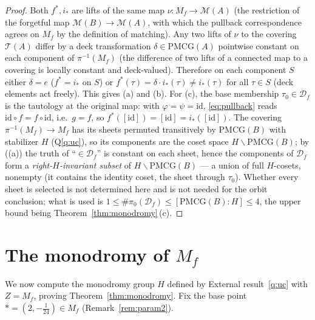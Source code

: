 \documentclass[11pt]{article}
\theoremstyle{definition}
\theoremstyle{remark}
\newcommand{\Teich}{\mathcal T}
\newcommand{\MM}{\mathcal M}
\newcommand{\PMCG}{\mathrm{PMCG}}
\newcommand{\Df}{\mathcal D_f}
\begin{document}
\begin{proof}
Both $f^*,i_*$ are lifts of the same map $\nu:M_f\to\MM(A)$ (the
restriction of the forgetful map $\MM(B)\to\MM(A)$, with which the
pullback correspondence agrees on $M_f$ by the definition of matching).
Any two lifts of $\nu$ to the covering $\Teich(A)$ differ by a deck
transformation $\delta\in\PMCG(A)$ pointwise constant on each component
of $\pi^{-1}(M_f)$ (the difference of two lifts of a connected map to
a covering is locally constant and deck-valued).  Therefore on each
component $S$ either $\delta=e$ ($f^*=i_*$ on $S$) or
$f^*(\tau)=\delta\cdot i_*(\tau)\neq i_*(\tau)$ for all $\tau\in S$
(deck elements act freely).  This gives (a) and (b).  For (c), the
base membership $\tau_0\in\Df$ is the tautology at the original map:
with $\varphi=\psi=\mathrm{id}$, \eqref{eq:pullback} reads
$\mathrm{id}\circ f=f\circ\mathrm{id}$, i.e.\ $g=f$, so
$f^*([\mathrm{id}])=[\mathrm{id}]=i_*([\mathrm{id}])$.  The covering
$\pi^{-1}(M_f)\to M_f$ has its sheets permuted transitively by
$\PMCG(B)$ with stabilizer $H$ \textup{(}Q\ref{q:uc}\textup{)}, so its
components are the coset space $H\backslash\PMCG(B)$; by
\textup{(}(a)\textup{)} the truth of ``$\in\Df$'' is constant on each
sheet, hence the components of $\Df$ form a \emph{right-$H$-invariant
subset} of $H\backslash\PMCG(B)$ — a union of full $H$-cosets,
nonempty \textup{(}it contains the identity coset, the sheet through
$\tau_0$\textup{)}.  Whether every sheet is selected is not determined
here and is not needed for the orbit conclusion; what is used is
$1\le\#\pi_0(\Df)\le[\PMCG(B):H]\le4$, the upper bound being
Theorem~\ref{thm:monodromy}\,\textup{(}c\textup{)}.
\end{proof}
\section{The monodromy of $M_f$}\label{sec:monodromy}

We now compute the monodromy group $H$ defined by
External result~\ref{q:uc} with $Z=M_f$, proving
Theorem~\ref{thm:monodromy}.  Fix the base point
$\ast=(2,-\tfrac1{24})\in M_f$ (Remark~\ref{rem:param2}).
\end{document}
